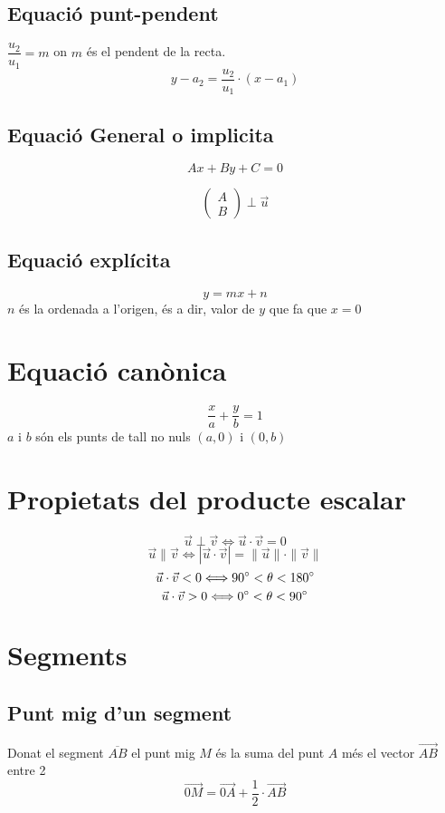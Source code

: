 \documentclass[12pt,a4paper]{article}
\newcommand{\module}[1]{\|#1\|}
\begin{document}
\subsection{Equació punt-pendent}
$\dfrac{u_2}{u_1} = m$ on $m$ és el pendent de la recta.
$$
y-a_2=\frac{u_2}{u_1}\cdot \left(x-a_1\right)
$$

\subsection{Equació General o implicita}
$$Ax + By + C = 0$$

$$\begin{pmatrix}
    A \\
    B
\end{pmatrix} \perp \vec{u}$$
\subsection{Equació explícita}

$$y=mx+n$$
$n$ és la ordenada a l'origen, és a dir, valor de $y$ que fa que $x = 0$

\section{Equació canònica}
$$\frac{x}{a}+\frac{y}{b}=1$$
$a$ i $b$ són els punts de tall no nuls
$(a, 0)$ i $(0, b)$

\section{Propietats del producte escalar}

$$\vec{u} \perp \vec{v} \Longleftrightarrow \vec{u} \cdot \vec{v} = 0$$
$$\vec{u} \parallel \vec{v} \Longleftrightarrow |\vec{u} \cdot \vec{v}| = \module{\vec{u}}\cdot\module{\vec{v}}$$
$$\vec{u}\cdot\vec{v} < 0 \Longleftrightarrow 90\degree < \theta < 180\degree $$
$$\vec{u}\cdot\vec{v} > 0 \Longleftrightarrow 0\degree < \theta < 90\degree$$

\section{Segments}
\subsection{Punt mig d'un segment}

Donat el segment $\overline{AB}$ el punt mig $M$ és la suma del punt $A$ més el vector $\vec{AB}$ entre 2
$$\vec{0M} = \vec{0A}+\frac{1}{2}\cdot\vec{AB}$$
\end{document}
